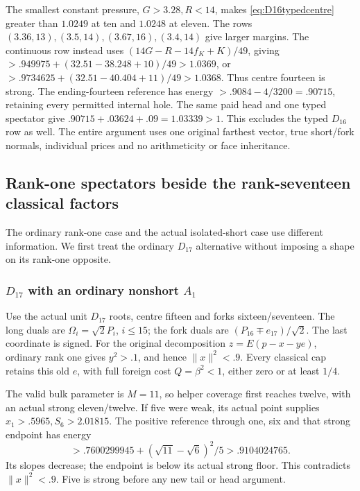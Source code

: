 \documentclass[11pt]{article}
\theoremstyle{definition}
\theoremstyle{remark}
\newcommand{\norm}[1]{\lVert #1\rVert}
\begin{document}
The smallest constant pressure, \(G>3.28,R<14\), makes
\eqref{eq:D16typedcentre} greater than \(1.0249\) at ten and
\(1.0248\) at eleven. The rows \((3.36,13),(3.5,14),
(3.67,16),(3.4,14)\) give larger margins. The continuous row
instead uses \((14G-R-14f_K+K)/49\), giving
\(>.949975+(32.51-38.248+10)/49>1.0369\), or
\(>.9734625+(32.51-40.404+11)/49>1.0368\).
Thus centre fourteen is strong. The ending-fourteen reference has
energy \(>.9084-4/3200=.90715\), retaining every permitted
internal hole. The same paid head and one typed spectator give
\(.90715+.03624+.09=1.03339>1\).
This excludes the typed \(D_{16}\) row as well. The entire
argument uses one original farthest vector, true short/fork normals,
individual prices and no arithmeticity or face inheritance.

\subsection{Rank-one spectators beside the rank-seventeen classical factors}
\label{app:rank17classical18}
The ordinary rank-one case and the actual isolated-short case use
different information. We first treat the ordinary \(D_{17}\)
alternative without imposing a shape on its rank-one opposite.

\subsubsection[D17 with an ordinary nonshort A1]{\(D_{17}\) with an ordinary nonshort \(A_1\)}
\label{app:D17ordinary18}
Use the actual unit \(D_{17}\) roots, centre fifteen and forks
sixteen/seventeen. The long duals are \(\Omega_i=\sqrt2P_i\),
\(i\le15\); the fork duals are
\((P_{16}\mp e_{17})/\sqrt2\). The last coordinate is signed.
For the original decomposition \(z=E(p-x-ye)\), ordinary rank
one gives \(y^2>.1\), and hence \(\norm x^2<.9\).
Every classical cap retains this old \(e\), with full foreign
cost \(Q=\beta^2<1\), either zero or at least \(1/4\).

The valid bulk parameter is \(M=11\), so helper coverage first
reaches twelve, with an actual strong eleven/twelve. If five were
weak, its actual point supplies \(x_1>.5965,S_6>2.01815\).
The positive reference through one, six and that strong endpoint
has energy
\[
 >.7600299945+(\sqrt{11}-\sqrt6)^2/5>.9104024765.
\]
Its slopes decrease; the endpoint is below its actual strong floor.
This contradicts \(\norm x^2<.9\). Five is strong before any
new tail or head argument.
\end{document}

